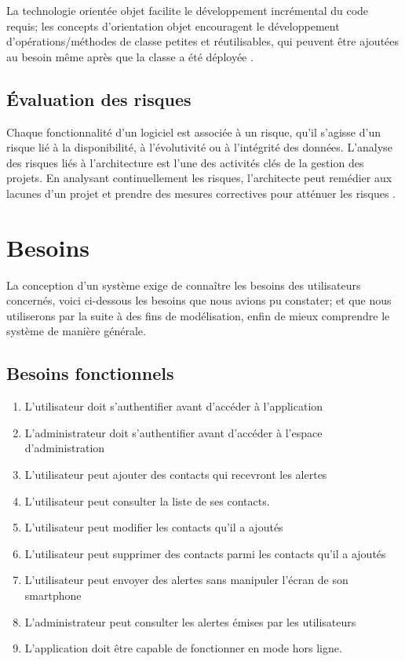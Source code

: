 La technologie orientée objet facilite le développement incrémental du code requis; les concepts d'orientation objet encouragent le développement d'opérations/méthodes de classe petites et réutilisables, qui peuvent être ajoutées au besoin même après que la classe a été déployée \cite{the_dsdm_consortium_dsdm}.


\subsection{Évaluation des risques}
Chaque fonctionnalité d’un logiciel est associée à un risque, qu'il s'agisse d'un risque lié à la disponibilité, à l'évolutivité ou à l'intégrité des données. L'analyse des risques liés à l'architecture est l'une des activités clés de la gestion des projets. En analysant continuellement les risques, l'architecte peut remédier aux lacunes d’un projet et prendre des mesures correctives pour atténuer les risques \cite{mark_richards_fundamentals}.

\section{Besoins}
La conception d’un système exige de connaître les besoins des utilisateurs concernés, voici ci-dessous les besoins que nous avions pu constater; et que nous utiliserons par la suite à des fins de modélisation, enfin de mieux comprendre le système de manière générale.

\subsection{Besoins fonctionnels}
\begin{enumerate}
	\item L’utilisateur doit s’authentifier avant d’accéder à l’application
	\item L’administrateur doit s’authentifier avant d’accéder à l’espace d’administration
	\item L’utilisateur peut ajouter des contacts qui recevront les alertes
	\item L’utilisateur peut consulter la liste de ses contacts.
	\item L’utilisateur peut modifier les contacts qu’il a ajoutés
	\item L’utilisateur peut supprimer des contacts parmi les contacts qu’il a ajoutés
	\item L'utilisateur peut envoyer des alertes sans manipuler l'écran de son smartphone
	\item L’administrateur peut consulter les alertes émises par les utilisateurs
	\item L'application doit être capable de fonctionner en mode hors ligne.
\end{enumerate}

